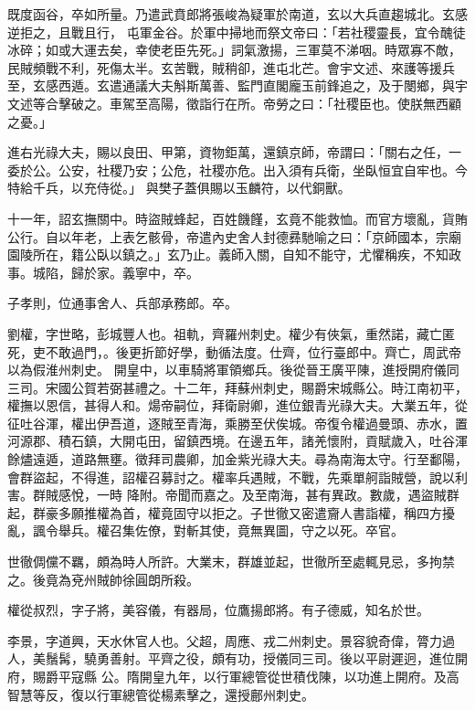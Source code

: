 \begin{pinyinscope}
 既度函谷，卒如所量。乃遣武賁郎將張峻為疑軍於南道，玄以大兵直趨城北。玄感逆拒之，且戰且行，
 屯軍金谷。於軍中掃地而祭文帝曰：「若社稷靈長，宜令醜徒冰碎；如或大運去矣，幸使老臣先死。」詞氣激揚，三軍莫不涕咽。時眾寡不敵，民賊頻戰不利，死傷太半。玄苦戰，賊稍卻，進屯北芒。會宇文述、來護等援兵至，玄感西遁。玄遣通議大夫斛斯萬善、監門直閣龐玉前鋒追之，及于閿鄉，與宇文述等合擊破之。車駕至高陽，徵詣行在所。帝勞之曰：「社稷臣也。使朕無西顧之憂。」



 進右光祿大夫，賜以良田、甲第，資物鉅萬，還鎮京師，帝謂曰：「關右之任，一委於公。公安，社稷乃安；公危，社稷亦危。出入須有兵衛，坐臥恒宜自牢也。今特給千兵，以充侍從。」
 與樊子蓋俱賜以玉麟符，以代銅獸。



 十一年，詔玄撫關中。時盜賊蜂起，百姓饑饉，玄竟不能救恤。而官方壞亂，貨賄公行。自以年老，上表乞骸骨，帝遣內史舍人封德彞馳喻之曰：「京師國本，宗廟園陵所在，籍公臥以鎮之。」玄乃止。義師入關，自知不能守，尤懼稱疾，不知政事。城陷，歸於家。義寧中，卒。



 子孝則，位通事舍人、兵部承務郎。卒。



 劉權，字世略，彭城豐人也。祖軌，齊羅州刺史。權少有俠氣，重然諾，藏亡匿死，吏不敢過門，。後更折節好學，動循法度。仕齊，位行臺郎中。齊亡，周武帝以為假淮州刺史。
 開皇中，以車騎將軍領鄉兵。後從晉王廣平陳，進授開府儀同三司。宋國公賀若弼甚禮之。十二年，拜蘇州刺史，賜爵宋城縣公。時江南初平，權撫以恩信，甚得人和。煬帝嗣位，拜衛尉卿，進位銀青光祿大夫。大業五年，從征吐谷渾，權出伊吾道，逐賊至青海，乘勝至伏俟城。帝復令權過曼頭、赤水，置河源郡、積石鎮，大開屯田，留鎮西境。在邊五年，諸羌懷附，貢賦歲入，吐谷渾餘燼遠遁，道路無壅。徵拜司農卿，加金紫光祿大夫。尋為南海太守。行至鄱陽，會群盜起，不得進，詔權召募討之。權率兵遇賊，不戰，先乘單舸詣賊營，說以利害。群賊感悅，一時
 降附。帝聞而嘉之。及至南海，甚有異政。數歲，遇盜賊群起，群豪多願推權為首，權竟固守以拒之。子世徹又密遣齎人書詣權，稱四方擾亂，諷令舉兵。權召集佐僚，對斬其使，竟無異圖，守之以死。卒官。



 世徹倜儻不羈，頗為時人所許。大業末，群雄並起，世徹所至處輒見忌，多拘禁之。後竟為兗州賊帥徐圓朗所殺。



 權從叔烈，字子將，美容儀，有器局，位鷹揚郎將。有子德威，知名於世。



 李景，字道興，天水休官人也。父超，周應、戎二州刺史。景容貌奇偉，膂力過人，美鬚髯，驍勇善射。平齊之役，頗有功，授儀同三司。後以平尉遲迥，進位開府，賜爵平寇縣
 公。隋開皇九年，以行軍總管從世積伐陳，以功進上開府。及高智慧等反，復以行軍總管從楊素擊之，還授鄜州刺史。




\end{pinyinscope}
